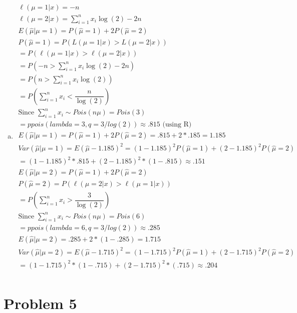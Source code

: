 \documentclass{article}
\newcommand{\sumx}{\sum_{i=1}^{n}x_i}
\newcommand{\uh}{\hat{\mu}}
\begin{document}
\begin{flushleft}
\begin{enumerate}[(a)]
	\item 
\begin{multline*}\\
\ell(\mu=1|x)=-n\\
\ell(\mu=2|x)=\sumx\log(2)-2n\\
E(\hat{\mu}|\mu=1)=P(\uh=1)+2P(\uh=2)\\
P(\uh=1)=P(L(\mu=1|x)>L(\mu=2|x))\\
=P(\ell(\mu=1|x)>\ell(\mu=2|x))\\
=P(-n>\sumx\log(2)-2n)\\
=P(n>\sumx\log(2))\\
=P\left(\sumx <\dfrac{n}{\log(2)}\right)\\ \text{Since } \sumx \sim Pois(n\mu)=Pois(3)\\
=ppois(lambda = 3,q = 3/log(2))\approx .815 \text{ (using R)}\\
E(\hat{\mu}|\mu=1)=P(\uh=1)+2P(\uh=2)=.815+2*.185=1.185\\
Var(\uh|\mu=1)=E(\uh-1.185)^2=(1-1.185)^2P(\uh=1)+(2-1.185)^2P(\uh=2)\\
=(1-1.185)^2*.815+(2-1.185)^2*(1-.815)\approx .151\\
E(\hat{\mu}|\mu=2)=P(\uh=1)+2P(\uh=2)\\
P(\uh=2)=P(\ell(\mu=2|x)>\ell(\mu=1|x))\\
=P\left(\sumx >\dfrac{3}{\log(2)}\right)\\
\text{Since } \sumx \sim Pois(n\mu)=Pois(6)\\
=ppois(lambda=6,q=3/log(2))\approx .285\\
E(\uh|\mu=2)=.285+2*(1-.285)=1.715\\
Var(\uh|\mu=2)=E(\uh-1.715)^2=(1-1.715)^2P(\uh=1)+(2-1.715)^2P(\uh=2)\\
=(1-1.715)^2*(1-.715)+(2-1.715)^2*(.715)\approx .204\\
\end{multline*}

\end{enumerate}

	\section*{Problem 5}
\begin{enumerate}[(a)]
	

\end{enumerate}
\end{flushleft}
\end{document}

